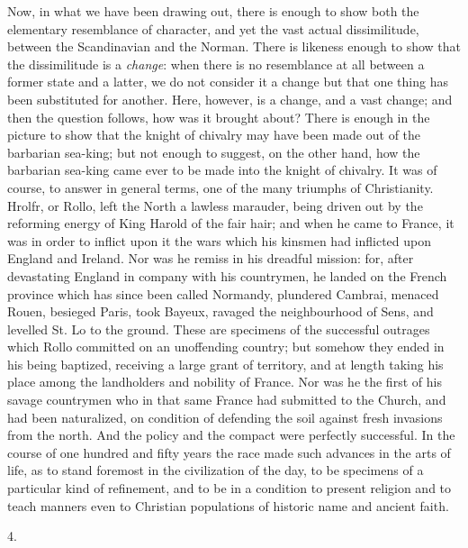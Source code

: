 Now, in what we have been
drawing out, there is enough to show both the elementary resemblance
of character, and yet the vast actual dissimilitude, between the
Scandinavian and the Norman. There is likeness enough to show that the
dissimilitude is a \emph{change}: when there is no resemblance
at all between a former state and a latter, we do not consider it a
change but that one thing has been substituted for another. Here,
however, is a change, and a vast change; and then the question
follows, how was it brought about? There is enough in the picture to
show that the knight of chivalry may have been made out of the
barbarian sea-king; but not enough to suggest, on the other hand, how
the barbarian sea-king came ever to be made into the knight of
chivalry. It was of course, to answer in general terms, one of the
many triumphs of Christianity. Hrolfr, or Rollo, left the North a
lawless marauder, being driven out by the reforming energy of King
Harold of the fair hair; and when he came to France, it was in order
to inflict upon it the wars which his kinsmen had inflicted upon
England and Ireland. Nor was he remiss in his dreadful mission: for,
after devastating England in company with his countrymen, he landed on
the French province which has since been called Normandy, plundered
Cambrai, menaced Rouen, besieged Paris, took Bayeux, ravaged the
neighbourhood of Sens, and levelled St. Lo to the ground. These are
specimens of the successful outrages which Rollo committed on an
unoffending country; but somehow they ended in his being baptized,
receiving a large grant of territory, and at length taking his place
among the landholders and nobility of France. Nor was he the first of
his savage countrymen who in that same France had submitted to the
Church, and had been naturalized, on condition of defending the soil
against fresh invasions from the north. And the policy and the compact
were perfectly successful. In the course of one hundred and fifty
years the race made such advances in the arts of life, as to stand
foremost in the civilization of the day, to be specimens of a
particular kind of refinement, and to be in a condition to
present religion and to teach manners even to Christian populations of
historic name and ancient faith.

4.

